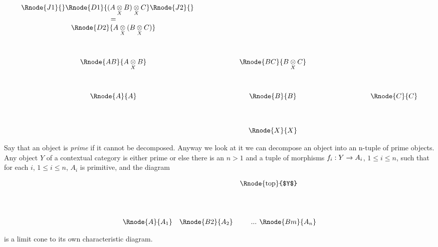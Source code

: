 \documentclass[10pt,a4paper]{scrartcl}
\begin{document}
\begin{displaymath}
\begin{array}{cp{1.0cm}cp{1.0cm}c}
\Rnode{J1}{}\Rnode{D1} {\crossx{(\crossx{A}{B}{X})}{C}{X}}\Rnode{J2}{} \ \ \ \ \   &&  &&  \\ 
= && && \\
\Rnode{D2} {\crossx{A}{(\crossx{B}{C}{X})}{X}}    &&  &&                        \\ [1.3cm]
\Rnode{AB}{\crossx{A}{B}{X}}&& \Rnode{BC}{\crossx{B}{C}{X}} &&                      \\[1.3cm]
\Rnode{A}{A}&& \Rnode{B}{B} && \ \ \ \ \ \ \ \ \ \ \ \ \ \Rnode{C}{C}                                        \\[1.3cm]
             && \Rnode{X}{X} &&                                                     
\end{array}
\end{displaymath}


\noindent Say that an object is \textit{prime} if it cannot be decomposed.
\noindent Anyway we look at it we can decompose an object into an n-tuple of prime objects. 
\noindent Any object $Y$ of a contextual category \ccat is either prime or else there is an $n > 1$ and a tuple of morphisms $f_i: Y \rightarrow A_i$, $1 \leq i \leq n$, such that for each $i$, $1 \leq i \leq n$,  $A_i$ is primitive, 
and the diagram
\begin{center}
\setlength{\arraycolsep}{0.3cm}
\begin{displaymath}
\begin{array}{ccp{0.2cm}p{0.075cm}c}
&&\Rnode{top}{$Y$}& & \\[1.5cm]
\Rnode{A}{A_1}&\Rnode{B2}{A_2}&& ... & \Rnode{Bm}{A_n}\\
\end{array}
\end{displaymath}
\end{center}
 is a limit cone to its own characteristic diagram.
\end{document}
